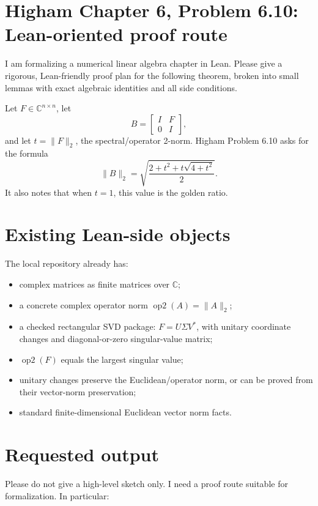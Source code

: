 \documentclass{article}
\begin{document}
\section*{Higham Chapter 6, Problem 6.10: Lean-oriented proof route}

I am formalizing a numerical linear algebra chapter in Lean.  Please give a
rigorous, Lean-friendly proof plan for the following theorem, broken into small
lemmas with exact algebraic identities and all side conditions.

Let \(F\in\mathbb C^{n\times n}\), let
\[
  B=\begin{bmatrix} I & F\\ 0 & I\end{bmatrix},
\]
and let \(t=\|F\|_2\), the spectral/operator 2-norm.  Higham Problem 6.10 asks
for the formula
\[
  \|B\|_2
  =
  \sqrt{\frac{2+t^2+t\sqrt{4+t^2}}{2}}.
\]
It also notes that when \(t=1\), this value is the golden ratio.

\section*{Existing Lean-side objects}

The local repository already has:

\begin{itemize}
\item complex matrices as finite matrices over \(\mathbb C\);
\item a concrete complex operator norm \(\operatorname{op2}(A)=\|A\|_2\);
\item a checked rectangular SVD package:
  \(F=U\Sigma V^*\), with unitary coordinate changes and diagonal-or-zero
  singular-value matrix;
\item \(\operatorname{op2}(F)\) equals the largest singular value;
\item unitary changes preserve the Euclidean/operator norm, or can be proved
  from their vector-norm preservation;
\item standard finite-dimensional Euclidean vector norm facts.
\end{itemize}

\section*{Requested output}

Please do not give a high-level sketch only.  I need a proof route suitable for
formalization.  In particular:
\end{document}
